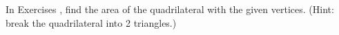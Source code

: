 {\noindent In Exercises}
{, find the area of the quadrilateral with the given vertices. (Hint: break the quadrilateral into 2 triangles.)
}
